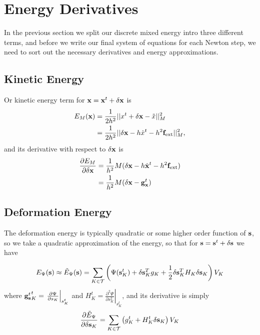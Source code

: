 
\section{Energy Derivatives}

In the previous section we split our discrete mixed energy intro three different terms, and before we write our final system of equations for each Newton step, we need to sort out the necessary derivatives and energy approximations.

\subsection{Kinetic Energy}
Or kinetic energy term for $\mathbf{x} = \mathbf{x}^t + \delta \mathbf{x}$ is
\begin{align}
E_M (\mathbf{x}) &= \frac{1}{2h^2} ||x^t + \delta \mathbf{x} - \tilde{x}||_M^2 \\
	&= \frac{1}{2h^2} ||\delta \mathbf{x} - h\dot{x}^t - h^2 \mathbf{f}_\text{ext} ||_M^2,
\end{align}
and its derivative with respect to $\delta \mathbf{x}$ is
\begin{equation}
\begin{split}
\frac{\partial E_M }{\partial \delta \mathbf{x}} &= \frac{1}{h^2}M(\delta \mathbf{x} - h\dot{\mathbf{x}}^t - h^2 \mathbf{f}_\text{ext}) \\
&=  \frac{1}{h^2}M(\delta \mathbf{x} -{\mathbf{g}_{\mathbf{x}}^t}) 
\end{split}
\end{equation}

\subsection{Deformation Energy}
The deformation energy is typically quadratic or some higher order function of $\mathbf{s}$, so we take a quadratic approximation of the energy, so that for $\mathbf{s}=\mathbf{s}^t + \delta \mathbf{s}$ we have

\begin{equation}
E_\Psi (\mathbf{s}) \approx \tilde{E}_\Psi (\mathbf{s}) = \sum_{K \in \mathcal{T}} \left(\Psi(\mathbf{s}_K^t) + \delta \mathbf{s}_K^T g_K + \frac{1}{2}\delta \mathbf{s}_K^T H_K \delta \mathbf{s}_K \right) V_K
\end{equation}
where 
${\mathbf{g}_{\mathbf{s}}^t}_K^t=\left.\frac{\partial \Psi}{\partial s_K}\right|_{s_K^t}$ and
$H_K^t=\left.\frac{\partial^2 \Psi}{\partial s_K^2}\right|_{s_K^t}$, and its derivative is simply
\begin{equation}
\frac{\partial \tilde{E}_\Psi}{\partial \delta \mathbf{s}_K} =
\sum_{K \in \mathcal{T}} \left(g_K^t + H_K^t \delta \mathbf{s}_K \right) V_K
\end{equation}


